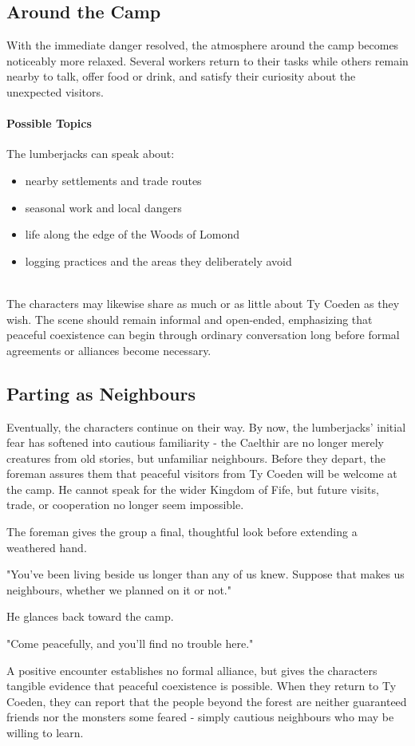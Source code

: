 \subsection*{Around the Camp}
{\entryfont With the immediate danger resolved, the atmosphere around the camp becomes noticeably more relaxed. Several workers return to their tasks while others remain nearby to talk, offer food or drink, and satisfy their curiosity about the unexpected visitors.\\
\paragraph*{Possible Topics} The lumberjacks can speak about:
\begin{itemize}
	\item nearby settlements and trade routes
	\item seasonal work and local dangers
	\item life along the edge of the Woods of Lomond
	\item logging practices and the areas they deliberately avoid
\end{itemize}
\hfill\\
The characters may likewise share as much or as little about Ty Coeden as they wish. The scene should remain informal and open-ended, emphasizing that peaceful coexistence can begin through ordinary conversation long before formal agreements or alliances become necessary.}
\subsection*{Parting as Neighbours}
{\entryfont Eventually, the characters continue on their way. By now, the lumberjacks' initial fear has softened into cautious familiarity - the Caelthir are no longer merely creatures from old stories, but unfamiliar neighbours. Before they depart, the foreman assures them that peaceful visitors from Ty Coeden will be welcome at the camp. He cannot speak for the wider Kingdom of Fife, but future visits, trade, or cooperation no longer seem impossible.}
\begin{DndReadAloud}
	The foreman gives the group a final, thoughtful look before extending a weathered hand.

	"You've been living beside us longer than any of us knew. Suppose that makes us neighbours, whether we planned on it or not."

	He glances back toward the camp.

	"Come peacefully, and you'll find no trouble here."
\end{DndReadAloud}
{\noindent\entryfont A positive encounter establishes no formal alliance, but gives the characters tangible evidence that peaceful coexistence is possible. When they return to Ty Coeden, they can report that the people beyond the forest are neither guaranteed friends nor the monsters some feared - simply cautious neighbours who may be willing to learn.}